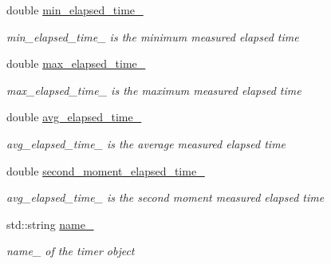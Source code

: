 \begin{DoxyCompactItemize}
\mbox{\label{classreal__time__tools_1_1Timer_a212c2fff68b8098731ab59f14416ce01}} 
double \hyperlink{classreal__time__tools_1_1Timer_a212c2fff68b8098731ab59f14416ce01}{min\+\_\+elapsed\+\_\+time\+\_\+}
\begin{DoxyCompactList}\small\item\em min\+\_\+elapsed\+\_\+time\+\_\+ is the minimum measured elapsed time \end{DoxyCompactList}\item 
\mbox{\label{classreal__time__tools_1_1Timer_a6d794ee63c2eafb0399d55b433c27c43}} 
double \hyperlink{classreal__time__tools_1_1Timer_a6d794ee63c2eafb0399d55b433c27c43}{max\+\_\+elapsed\+\_\+time\+\_\+}
\begin{DoxyCompactList}\small\item\em max\+\_\+elapsed\+\_\+time\+\_\+ is the maximum measured elapsed time \end{DoxyCompactList}\item 
\mbox{\label{classreal__time__tools_1_1Timer_a058a28efa6f0fd3c4e332068e7db8574}} 
double \hyperlink{classreal__time__tools_1_1Timer_a058a28efa6f0fd3c4e332068e7db8574}{avg\+\_\+elapsed\+\_\+time\+\_\+}
\begin{DoxyCompactList}\small\item\em avg\+\_\+elapsed\+\_\+time\+\_\+ is the average measured elapsed time \end{DoxyCompactList}\item 
\mbox{\label{classreal__time__tools_1_1Timer_a1d4e8ddf078ef1c544e2715a0420726a}} 
double \hyperlink{classreal__time__tools_1_1Timer_a1d4e8ddf078ef1c544e2715a0420726a}{second\+\_\+moment\+\_\+elapsed\+\_\+time\+\_\+}
\begin{DoxyCompactList}\small\item\em avg\+\_\+elapsed\+\_\+time\+\_\+ is the second moment measured elapsed time \end{DoxyCompactList}\item 
\mbox{\label{classreal__time__tools_1_1Timer_aadcaf1f743a7d3d967b740ec04fc0607}} 
std\+::string \hyperlink{classreal__time__tools_1_1Timer_aadcaf1f743a7d3d967b740ec04fc0607}{name\+\_\+}
\begin{DoxyCompactList}\small\item\em name\+\_\+ of the timer object \end{DoxyCompactList}\end{DoxyCompactItemize}


